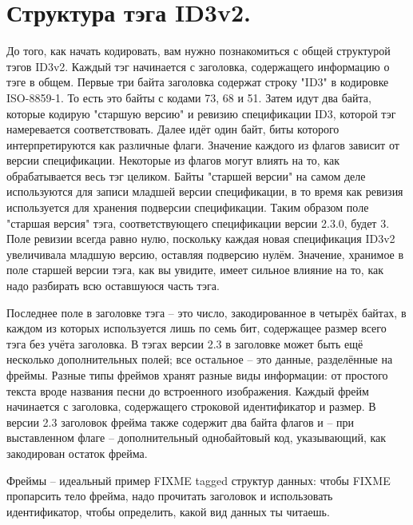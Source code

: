\section{Структура тэга ID3v2.}

До того, как начать кодировать, вам нужно познакомиться с общей структурой тэгов
ID3v2. Каждый тэг начинается с заголовка, содержащего информацию о тэге в общем. Первые
три байта заголовка содержат строку "ID3" в кодировке ISO-8859-1. То есть это байты с
кодами 73, 68 и 51. Затем идут два байта, которые кодирую "старшую версию" и ревизию
спецификации ID3, которой тэг намеревается соответствовать. Далее идёт один байт, биты
которого интерпретируются как различные флаги. Значение каждого из флагов зависит от
версии спецификации. Некоторые из флагов могут влиять на то, как обрабатывается весь тэг
целиком.  Байты "старшей версии" на самом деле используются для записи младшей версии
спецификации, в то время как ревизия используется для хранения подверсии
спецификации. Таким образом поле "старшая версия" тэга, соответствующего спецификации
версии 2.3.0, будет 3. Поле ревизии всегда равно нулю, поскольку каждая новая спецификация
ID3v2 увеличивала младшую версию, оставляя подверсию нулём. Значение, хранимое в поле
старшей версии тэга, как вы увидите, имеет сильное влияние на то, как надо разбирать всю
оставшуюся часть тэга.

Последнее поле в заголовке тэга -- это число, закодированное в четырёх байтах, в каждом из
которых используется лишь по семь бит, содержащее размер всего тэга без учёта заголовка.
В тэгах версии 2.3 в заголовке может быть ещё несколько дополнительных полей; все
остальное -- это данные, разделённые на фреймы.  Разные типы фреймов хранят разные виды
информации: от простого текста вроде названия песни до встроенного изображения.  Каждый
фрейм начинается с заголовка, содержащего строковой идентификатор и размер. В версии 2.3
заголовок фрейма также содержит два байта флагов и -- при выставленном флаге --
дополнительный однобайтовый код, указывающий, как закодирован остаток фрейма.

Фреймы -- идеальный пример FIXME tagged структур данных: чтобы FIXME пропарсить тело
фрейма, надо прочитать заголовок и использовать идентификатор, чтобы определить, какой вид
данных ты читаешь.

